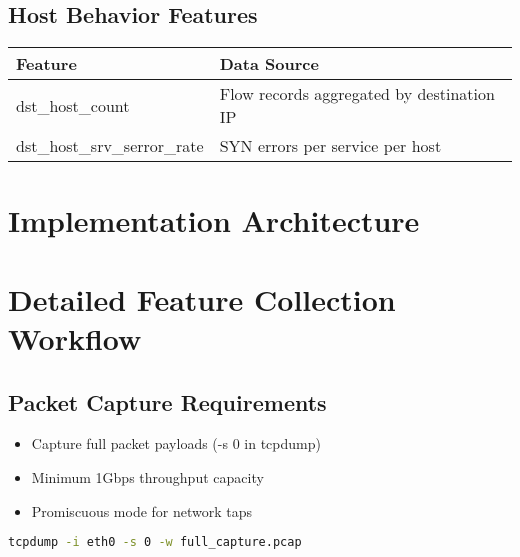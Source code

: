 \documentclass{article}
\begin{document}
\subsection{Host Behavior Features}
\begin{tabularx}{\textwidth}{ll}
    \toprule
    \textbf{Feature} & \textbf{Data Source} \\
    \midrule
    dst\_host\_count & Flow records aggregated by destination IP \\
    dst\_host\_srv\_serror\_rate & SYN errors per service per host \\
    \bottomrule
\end{tabularx}

\section{Implementation Architecture}
\begin{center}
\end{center}

\section{Detailed Feature Collection Workflow}
\subsection{Packet Capture Requirements}
\begin{itemize}
    \item Capture full packet payloads (-s 0 in tcpdump)
    \item Minimum 1Gbps throughput capacity
    \item Promiscuous mode for network taps
\end{itemize}

\begin{lstlisting}[language=bash, caption={Packet Capture Command}]
tcpdump -i eth0 -s 0 -w full_capture.pcap
\end{lstlisting}
\end{document}
